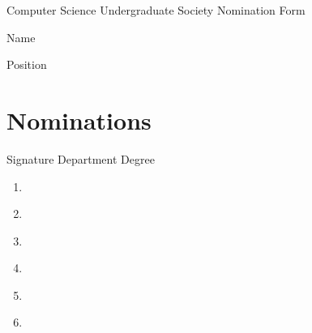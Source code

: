 \documentclass[fontsize=11]{scrartcl}
\begin{document}
\begin{center}
	\huge Computer Science Undergraduate Society Nomination Form
\end{center}

\begin{Form}

	Name \vspace{.5em} \\  \TextField[width=5in]{}
   
   \vspace{1.5em}
   
   Position \vspace{.5em} \\ \TextField[width=5in]{}
   
   \section*{Nominations}
   \begin{center}
	   
		   	Signature \hspace{.8in} Department \hspace{.3in} Degree
    \begin{enumerate}
    	    \item \makebox[2in]{\hrulefill}  \makebox[1in]{\hrulefill}  \makebox[1in]{\hrulefill}  \\ 
    	    
    	    \item \makebox[2in]{\hrulefill}  \makebox[1in]{\hrulefill}  \makebox[1in]{\hrulefill}  \\ 
    	    
    	    \item \makebox[2in]{\hrulefill}  \makebox[1in]{\hrulefill}  \makebox[1in]{\hrulefill}  \\ 
    	    
    	    \item \makebox[2in]{\hrulefill}  \makebox[1in]{\hrulefill}  \makebox[1in]{\hrulefill}  \\ 
    	    
    	    \item \makebox[2in]{\hrulefill}  \makebox[1in]{\hrulefill}  \makebox[1in]{\hrulefill}  \\ 
    	    
    	    \item \makebox[2in]{\hrulefill}  \makebox[1in]{\hrulefill}  \makebox[1in]{\hrulefill}  \\ 
    	    

\end{enumerate}
\end{center}
\end{Form}
\end{document}
